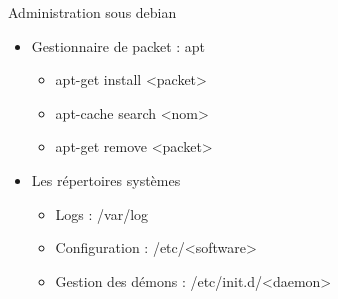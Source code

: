 \begin{frame}{Administration sous debian}

\begin{itemize}
  \item Gestionnaire de packet : apt
    \begin{itemize}
      \item apt-get install <packet>
      \item apt-cache search <nom>
      \item apt-get remove <packet>
    \end{itemize}
  \item Les répertoires systèmes 
  \begin{itemize}
    \item Logs : /var/log
    \item Configuration : /etc/<software>
    \item Gestion des démons : /etc/init.d/<daemon>
  \end{itemize}
\end{itemize}


\end{frame}



